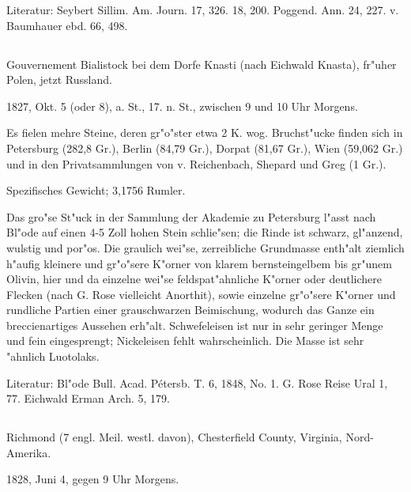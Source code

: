 \documentclass[a4paper, 11pt, oneside]{article}
\begin{document}
\normalsize
Literatur: Seybert Sillim. Am. Journ. 17, 326. 18, 200. Poggend. Ann. 24, 227. v. Baumhauer ebd. 66, 498.

\subsection{}
\LARGE
\paragraph{}
Gouvernement Bialistock bei dem Dorfe Knasti (nach Eichwald Knasta), fr"uher Polen, jetzt Russland.

1827, Okt. 5 (oder 8), a. St., 17. n. St., zwischen 9 und 10 Uhr Morgens.

Es fielen mehre Steine, deren gr"o"ster etwa 2 K. wog. Bruchst"ucke finden sich in Petersburg (282,8 Gr.), Berlin (84,79 Gr.), Dorpat (81,67 Gr.), Wien (59,062 Gr.) und in den Privatsammlungen von v. Reichenbach, Shepard und Greg (1 Gr.).

Spezifisches Gewicht; 3,1756 Rumler.

Das gro"se St"uck in der Sammlung der Akademie zu Petersburg l"asst nach Bl"ode auf einen 4-5 Zoll hohen Stein schlie"sen; die Rinde ist schwarz, gl"anzend, wulstig und por"os. Die graulich wei"se, zerreibliche Grundmasse enth"alt ziemlich h"aufig kleinere und gr"o"sere K"orner von klarem bernsteingelbem bis gr"unem Olivin, hier und da einzelne wei"se feldspat"ahnliche K"orner oder deutlichere Flecken (nach G. Rose vielleicht Anorthit), sowie einzelne gr"o"sere K"orner und rundliche Partien einer grauschwarzen Beimischung, wodurch das Ganze ein breccienartiges Aussehen erh"alt. Schwefeleisen ist nur in sehr geringer Menge und fein eingesprengt; Nickeleisen fehlt wahrscheinlich. Die Masse ist sehr "ahnlich Luotolaks.

\normalsize
Literatur: Bl"ode Bull. Acad. Pétersb. T. 6, 1848, No. 1. G. Rose Reise Ural 1, 77. Eichwald Erman Arch. 5, 179.

\subsection{}
\LARGE
\paragraph{}
Richmond (7 engl. Meil. westl. davon), Chesterfield County, Virginia, Nord-Amerika.

1828, Juni 4, gegen 9 Uhr Morgens.
\end{document}
